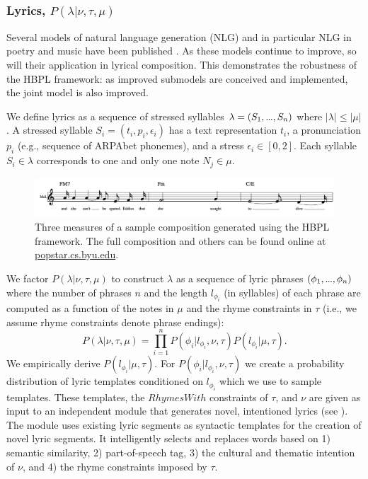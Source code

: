 \documentclass[letterpaper]{article}
\newcommand\mydots{\hbox to .75em{.\hss.\hss.}}
\begin{document}
\subsubsection{Lyrics, $P(\lambda|\nu,\tau,\mu)$}

Several models of natural language generation (NLG) and in particular NLG in poetry and music have been published \cite{paris2013natural}. As these models continue to improve, so will their application in lyrical composition. This demonstrates the robustness of the HBPL framework: as improved submodels are conceived and implemented, the joint model is also improved.

We define lyrics as a sequence of stressed syllables $\lambda=(S_1,\mydots,S_n)$ where $|\lambda| \le |\mu|$. A stressed syllable $S_i = (t_i, p_i, \epsilon_i)$ has a text representation $t_i$, a pronunciation $p_i$ (e.g., sequence of ARPAbet phonemes), and a stress $\epsilon_i\in[0,2]$. Each syllable $S_i\in\lambda$ corresponds to one and only one note $N_j\in\mu$.
\begin{figure}
	\centering
	\includegraphics[width=\linewidth]{example}
	\caption{\label{fig:example_composition} Three measures of a sample composition generated using the HBPL framework. The full composition and others can be found online at \url{popstar.cs.byu.edu}.}
\end{figure}

We factor $P(\lambda|\nu,\tau,\mu)$ to construct $\lambda$ as a sequence of lyric phrases $(\phi_1,\mydots,\phi_n)$ where the number of phrases $n$ and the length $l_{\phi_i}$ (in syllables) of each phrase are computed as a function of the notes in $\mu$ and the rhyme constraints in $\tau$ (i.e., we assume rhyme constraints denote phrase endings):
\[ P(\lambda|\nu,\tau,\mu) = \prod_{i=1}^n P(\phi_i | l_{\phi_i},\nu,\tau) P(l_{\phi_i} | \mu,\tau). \]
We empirically derive $P(l_{\phi_i} | \mu,\tau)$. For $P(\phi_i | l_{\phi_i},\nu,\tau)$ we create a probability distribution of lyric templates conditioned on $l_{\phi_i}$ which we use to sample templates. These templates, the $RhymesWith$ constraints of $\tau$, and $\nu$ are given as input to an independent module that generates novel, intentioned lyrics (see \citeauthor{bay2017ICCC} ). The module uses existing lyric segments as syntactic templates for the creation of novel lyric segments. It intelligently selects and replaces words based on 1) semantic similarity, 2) part-of-speech tag, 3) the cultural and thematic intention of $\nu$, and 4) the rhyme constraints imposed by $\tau$.
\end{document}
